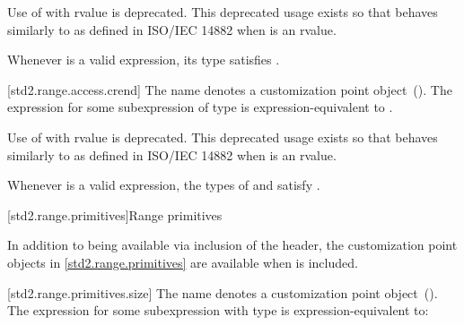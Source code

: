 \pnum
Use of  with rvalue  is deprecated.
\enternote This deprecated usage exists so that 
behaves similarly to  as defined in ISO/IEC 14882 when
 is an rvalue. \exitnote

\pnum
\enternote Whenever  is a valid expression, its
type satisfies . \exitnote

[std2.range.access.crend]{}
\pnum
The name  denotes a customization point
object~(). The expression
 for some subexpression  of type 
is expression-equivalent to .

\pnum
Use of  with rvalue  is deprecated.
\enternote This deprecated usage exists so that 
behaves similarly to  as defined in ISO/IEC 14882 when
 is an rvalue. \exitnote

\pnum
\enternote Whenever  is a valid expression, the
types of  and  satisfy
. \exitnote

[std2.range.primitives]{Range primitives}

\pnum
In addition to being available via inclusion of the 
header, the customization point objects in \ref{std2.range.primitives} are
available when  is included.

[std2.range.primitives.size]{}
\pnum
The name  denotes a customization point
object~(). The expression
 for some subexpression  with type
 is expression-equivalent to:

